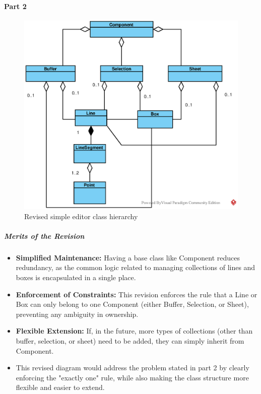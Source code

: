 \paragraph{Part 2}
\begin{figure}[H]
    \centering
    \includegraphics[width=\textwidth]{images/EPS/Exercise-1_Part-2.eps}
    \caption{Revised simple editor class hierarchy}
    \label{fig:Exercise-1_Part-2}
\end{figure}

\subparagraph{Merits of the Revision}
\begin{itemize}
    \item \textbf{Simplified Maintenance:} Having a base class like Component reduces redundancy, as the common logic related to managing collections of lines and boxes is encapsulated in a single place.
    \item \textbf{Enforcement of Constraints:} This revision enforces the rule that a Line or Box can only belong to one Component (either Buffer, Selection, or Sheet), preventing any ambiguity in ownership.
    \item \textbf{Flexible Extension:} If, in the future, more types of collections (other than buffer, selection, or sheet) need to be added, they can simply inherit from Component.
    \item This revised diagram would address the problem stated in part 2 by clearly enforcing the "exactly one" rule, while also making the class structure more flexible and easier to extend.
\end{itemize}

